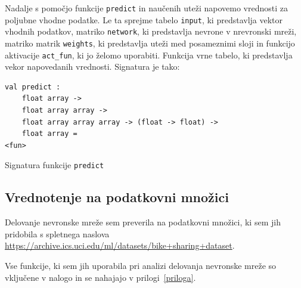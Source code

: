 \documentclass[mat1]{fmfdelo}
\begin{document}
Nadalje s pomočjo funkcije \texttt{predict} in naučenih uteži napovemo vrednosti za poljubne vhodne podatke. Le ta sprejme tabelo \texttt{input}, ki predstavlja vektor vhodnih podatkov, matriko \texttt{network}, ki predstavlja nevrone v nrevronski mreži, matriko matrik \texttt{weights}, ki predstavlja uteži med posameznimi sloji in funkcijo aktivacije \texttt{act\_fun}, ki jo želomo uporabiti. Funkcija vrne tabelo, ki predstavlja vekor napovedanih vrednosti. Signatura je tako:
%
\begin{listing}[!h]
	\begin{verbatim}
val predict :
	float array ->
	float array array ->
	float array array array -> (float -> float) -> 
	float array = 
<fun>
	\end{verbatim} 
	\caption{Signatura funkcije \texttt{predict}}
	\label{signatura2}
\end{listing}
%
\subsection{Vrednotenje na podatkovni množici}
Delovanje nevronske mreže sem preverila na podatkovni množici, ki sem jih pridobila s spletnega naslova \url{https://archive.ics.uci.edu/ml/datasets/bike+sharing+dataset}.

 Vse fun\-kci\-je, ki sem jih uporabila pri analizi delovanja nevronske mreže so vključene v nalogo in se nahajajo v prilogi~\ref{priloga}.
%
\end{document}
